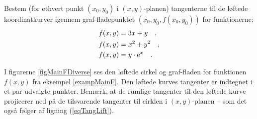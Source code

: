 \begin{exercise}
Bestem (for ethvert punkt $(x_{0},y_{0})$ i $(x,y)$-planen) tangenterne til de løftede koordinatkurver igennem graf-fladepunktet $(x_{0}, y_{0}, f(x_{0}, y_{0}))$ for funktionerne:
\begin{equation}
\begin{aligned}
  f(x,y) &= 3x + y \quad ,\\
  f(x,y) &= x^{2} + y^{2}\quad , \\
  f(x,y) &= y\cdot\mathrm{e}^{x} \quad.
\end{aligned}
\end{equation}
\end{exercise}



I figurerne \ref{figMainFDiverse} ses den løftede cirkel og graf-fladen for funktionen $f(x,y)$ fra eksempel \ref{exampMainF}. Den løftede kurves tangenter er indtegnet i et par udvalgte punkter.
Bemærk, at de rumlige tangenter til den løftede kurve projicerer ned på de tilsvarende tangenter til cirklen i $(x,y)$-planen -- som det også følger af ligning (\ref{eqTangLift}).



